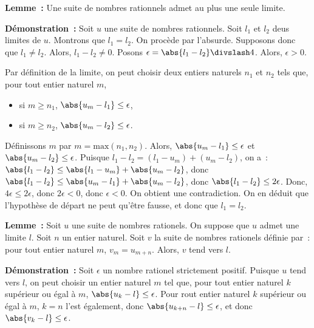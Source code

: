\medskip

\noindent\textbf{Lemme :} Une suite de nombres rationnels admet au plus une seule limite.

\medskip

\noindent\textbf{Démonstration :} Soit $u$ une suite de nombres rationnels. 
    Soit $l_1$ et $l_2$ deus limites de $u$. 
    Montrons que $l_1 = l_2$. 
    On procède par l'absurde. 
    Supposons donc que $l_1 \neq l_2$.
    Alors, $l_1 - l_2 \neq 0$. 
    Posons $\epsilon = \abs{l_1 - l_2} \divslash 4$. 
    Alors, $\epsilon > 0$.
    
    Par définition de la limite, on peut choisir deux entiers naturels $n_1$ et $n_2$ tels que, pour tout entier naturel $m$,
    \begin{itemize}[nosep]
        \item si $m \geq n_1$, $\abs{u_m - l_1} \leq \epsilon$,
        \item si $m \geq n_2$, $\abs{u_m - l_2} \leq \epsilon$.
    \end{itemize}
    Définissons $m$ par $m = \mathrm{max}(n_1, n_2)$.
    Alors, $\abs{u_m - l_1} \leq \epsilon$ et $\abs{u_m - l_2} \leq \epsilon$.
    Puisque $l_1 - l_2 = (l_1 - u_m) + (u_m - l_2)$, on a : $\abs{l_1 - l_2} \leq \abs{l_1 - u_m} + \abs{u_m - l_2}$, donc $\abs{l_1 - l_2} \leq \abs{u_m - l_1} + \abs{u_m - l_2}$, donc $\abs{l_1 - l_2} \leq 2 \epsilon$.
    Donc, $4 \epsilon \leq 2 \epsilon$, donc $2 \epsilon < 0$, donc $\epsilon < 0$.
    On obtient une contradiction. 
    On en déduit que l'hypothèse de départ ne peut qu'être fausse, et donc que $l_1 = l_2$.

    \done

\medskip

\medskip

\noindent\textbf{Lemme :} Soit $u$ une suite de nombres rationels. 
    On suppose que $u$ admet une limite $l$. 
    Soit $n$ un entier naturel. 
    Soit $v$ la suite de nombres rationels définie par : pour tout entier naturel $m$, $v_m = u_{m+n}$.
    Alors, $v$ tend vers $l$.

\medskip

\noindent\textbf{Démonstration :} Soit $\epsilon$ un nombre rationel strictement positif.
    Puisque $u$ tend vers $l$, on peut choisir un entier naturel $m$ tel que, pour tout entier naturel $k$ supérieur ou égal à $m$, $\abs{u_k - l} \leq \epsilon$.
    Pour rout entier naturel $k$ supérieur ou égal à $m$, $k = n$ l'est également, donc $\abs{u_{k+n} - l} \leq \epsilon$, et donc $\abs{v_k - l} \leq \epsilon$.

